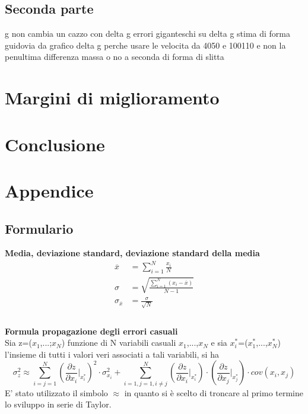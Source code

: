 \documentclass[a4paper,11pt,oneside]{article}
\begin{document}
\subsection{Seconda parte}
g non cambia un cazzo con delta g
errori giganteschi su delta g
stima di forma guidovia da grafico delta g
perche usare le velocita da 4050 e 100110 e non la penultima
differenza massa o no a seconda di forma di slitta



\section{Margini di miglioramento}
\section{Conclusione}
\newpage
\section{Appendice}

\subsection{Formulario}
\textbf{Media, deviazione standard, deviazione standard della media}
\begin{equation*}
    \begin{aligned}
        \overline{x}&=\sum\limits_{i=1}^{N} \frac{x_{i}}{N}\\
        \sigma&=\sqrt{\frac{\sum\limits_{i=1}^{N} (x_{i}-\overline{x})}{N-1}}\\
        \sigma_{\overline{x}}&=\frac{\sigma}{\sqrt{N}}\\
    \end{aligned}
\end{equation*}\\

\textbf{Formula propagazione degli errori casuali}\\

Sia z=($x_1$,...;$x_N$) funzione di N variabili casuali $x_1$,...,$x_N$ e sia ${x_i^\ast}$=($x_1^\ast$,...,$x_N^{\ast}$) l'insieme di tutti i valori veri associati a tali variabili, si ha 
\begin{equation*}
    \sigma_z^{2}\approx  \sum_{i=j=1}^{N}\left ( \frac{\partial z}{\partial x_i}\Big|_{x_i^{\ast}} \right )^{2}\cdot\sigma_{x_i}^{2} +\sum_{i=1,j=1,i\neq j}^{N}\left (\frac{\partial z }{\partial x_i}\Big|_{x_i^{\ast}} \right ) \cdot \left ( \frac{\partial z}{\partial x_j} \Big|_{x_j^{\ast}} \right )\cdot cov(x_i,x_j)\label{eq:teorema_varianze}
\end{equation*}
E' stato utilizzato il simbolo $\approx$ in quanto si è scelto di troncare al primo termine lo sviluppo in serie di Taylor.
\end{document}
